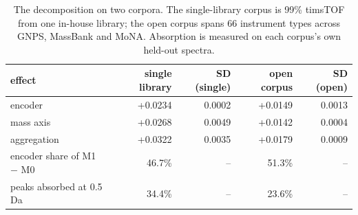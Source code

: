 \begin{table}[htbp]
\centering
\caption{The decomposition on two corpora. The single-library corpus is 99\% timsTOF from one in-house library; the open corpus spans 66 instrument types across GNPS, MassBank and MoNA. Absorption is measured on each corpus's own held-out spectra.}
\label{tab:table3_two_corpora}
\begin{tabular}{l r r r r}
\toprule
effect & single library & SD (single) & open corpus & SD (open) \\
\midrule
encoder & +0.0234 & 0.0002 & +0.0149 & 0.0013 \\
mass axis & +0.0268 & 0.0049 & +0.0142 & 0.0004 \\
aggregation & +0.0322 & 0.0035 & +0.0179 & 0.0009 \\
encoder share of M1 $-$ M0 & 46.7\% & -- & 51.3\% & -- \\
peaks absorbed at 0.5 Da & 34.4\% & -- & 23.6\% & -- \\
\bottomrule
\end{tabular}
\end{table}
